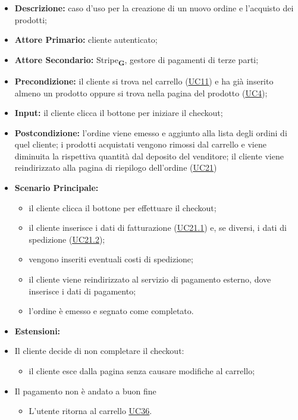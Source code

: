 \begin{itemize}
    \item \textbf{Descrizione:} caso d'uso per la creazione di un nuovo ordine e l'acquisto dei prodotti;
    \item \textbf{Attore Primario:} cliente autenticato;
    \item \textbf{Attore Secondario:} Stripe\textsubscript{\textbf{G}}, gestore di pagamenti di terze parti;
    \item \textbf{Precondizione:} il cliente si trova nel carrello (\hyperref[sec:UC11]{\underline{UC11}}) e ha già inserito almeno un prodotto oppure si trova nella pagina del prodotto (\hyperref[sec:UC4]{\underline{UC4}});
    \item \textbf{Input:} il cliente clicca il bottone per iniziare il checkout;
    \item \textbf{Postcondizione:} l'ordine viene emesso e aggiunto alla lista degli ordini di quel cliente; i prodotti acquistati vengono rimossi dal carrello e viene diminuita la rispettiva quantità dal deposito del venditore; il cliente viene reindirizzato alla pagina di riepilogo dell'ordine (\hyperref[sec:UC21]{\underline{UC21}})
    \item \textbf{Scenario Principale:}
          \begin{itemize}
              \item il cliente clicca il bottone per effettuare il checkout;
              \item il cliente inserisce i dati di fatturazione (\hyperref[sec:UC21.1]{\underline{UC21.1}}) e, se diversi, i dati di spedizione (\hyperref[sec:UC21.2]{\underline{UC21.2}});
              \item vengono inseriti eventuali costi di spedizione;
              \item il cliente viene reindirizzato al servizio di pagamento esterno, dove inserisce i dati di pagamento;
              \item l'ordine è emesso e segnato come completato.
          \end{itemize}
    \item \textbf{Estensioni:}
    \item Il cliente decide di non completare il checkout:
          \begin{itemize}
              \item  il cliente esce dalla pagina senza causare modifiche al carrello;
          \end{itemize}
    \item Il pagamento non è andato a buon fine
          \begin{itemize}
              \item L'utente ritorna al carrello \hyperref[sec:UC36]{\underline{UC36}}.
          \end{itemize}
\end{itemize}

